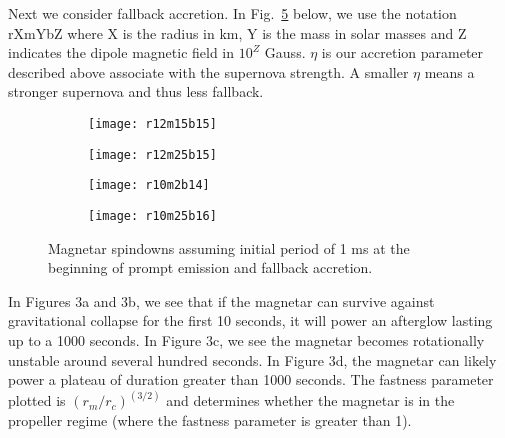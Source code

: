 \documentclass{article}
\begin{document}
Next we consider fallback accretion. In Fig.~\ref{fig:4} below, we use the notation rXmYbZ where X is the radius in km, Y is the mass in solar masses and Z indicates the dipole magnetic field in $10^Z$ Gauss. $\eta$ is our accretion parameter described above associate with the supernova strength. A smaller $\eta$ means a stronger supernova and thus less fallback.
\begin{figure}[h!]
\centering
\begin{subfigure}{.5\textwidth}
    \centering
    \texttt{[image: r12m15b15]}
    \caption{}
    \label{fig:4a}
\end{subfigure}%
\begin{subfigure}{.5\textwidth}
    \centering
    \texttt{[image: r12m25b15]}
    \caption{}
    \label{fig:4b}
\end{subfigure}
\begin{subfigure}{.5\textwidth}
    \centering
    \texttt{[image: r10m2b14]}
    \caption{}
    \label{fig:4c}
\end{subfigure}%
\begin{subfigure}{.5\textwidth}
    \centering
    \texttt{[image: r10m25b16]}
    \caption{}
    \label{fig:4c}
\end{subfigure}
\caption{Magnetar spindowns assuming initial period of 1 ms at the beginning of prompt emission and fallback accretion.}
\label{fig:4}
\end{figure}

In Figures 3a and 3b, we see that if the magnetar can survive against gravitational collapse for the first 10 seconds, it will power an afterglow lasting up to a 1000 seconds. In Figure 3c, we see the magnetar becomes rotationally unstable around several hundred seconds. In Figure 3d, the magnetar can likely power a plateau of duration greater than 1000 seconds. The fastness parameter plotted is $(r_m/r_c)^(3/2)$ and determines whether the magnetar is in the propeller regime (where the fastness parameter is greater than 1).
\newpage
\end{document}
